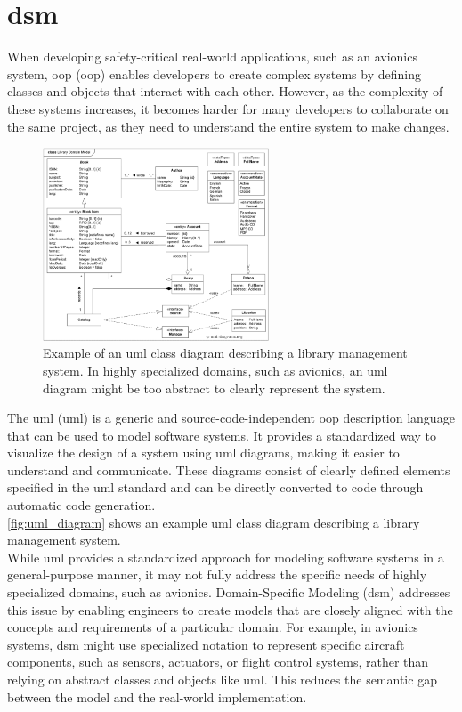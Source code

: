\section{\acrlong{dsm}}
\label{sec:domain_specific_modeling}
When developing safety-critical real-world applications, such as an avionics system, \acrlong{oop} (\acrshort{oop}) enables developers to create complex systems by defining classes and objects that interact with each other. However, as the complexity of these systems increases, it becomes harder for many developers to collaborate on the same project, as they need to understand the entire system to make changes.\\
\begin{figure}[h]
    \centering
    \includegraphics[width=0.6\textwidth]{pictures/uml_class_diagram.png}
    \caption[Example of an \acrshort{uml} class diagram]{Example of an \acrshort{uml} class diagram describing a library management system. In highly specialized domains, such as avionics, an \acrshort{uml} diagram might be too abstract to clearly represent the system. \cite{uml_diagrams_2016}}
    \label{fig:uml_diagram}
\end{figure}
The \acrlong{uml} (\acrshort{uml}) is a generic and source-code-independent \acrshort{oop} description language that can be used to model software systems. It provides a standardized way to visualize the design of a system using \acrshort{uml} diagrams, making it easier to understand and communicate. These diagrams consist of clearly defined elements specified in the \acrshort{uml} standard and can be directly converted to code through automatic code generation.\\
\autoref{fig:uml_diagram} shows an example \acrshort{uml} class diagram describing a library management system.\\
While \acrshort{uml} provides a standardized approach for modeling software systems in a general-purpose manner, it may not fully address the specific needs of highly specialized domains, such as avionics. Domain-Specific Modeling (\acrshort{dsm}) addresses this issue by enabling engineers to create models that are closely aligned with the concepts and requirements of a particular domain. For example, in avionics systems, \acrshort{dsm} might use specialized notation to represent specific aircraft components, such as sensors, actuators, or flight control systems, rather than relying on abstract classes and objects like \acrshort{uml}. This reduces the semantic gap between the model and the real-world implementation.\\
